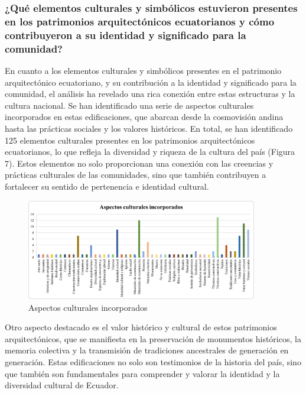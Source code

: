 \documentclass[journal,article,submit,pdftex,moreauthors]{Definitions/mdpi}
\begin{document}
\subsubsection{\textbf{¿Qué elementos culturales y simbólicos estuvieron presentes en los patrimonios arquitectónicos ecuatorianos y cómo contribuyeron a su identidad y significado para la comunidad?}}\par %
En cuanto a los elementos culturales y simbólicos presentes en el patrimonio arquitectónico ecuatoriano, y su contribución a la identidad y significado para la comunidad, el análisis ha revelado una rica conexión entre estas estructuras y la cultura nacional. Se han identificado una serie de aspectos culturales incorporados en estas edificaciones, que abarcan desde la cosmovisión andina hasta las prácticas sociales y los valores históricos. 
En total, se han identificado 125 elementos culturales presentes en los patrimonios arquitectónicos ecuatorianos, lo que refleja la diversidad y riqueza de la cultura del país (Figura 7). Estos elementos no solo proporcionan una conexión con las creencias y prácticas culturales de las comunidades, sino que también contribuyen a fortalecer su sentido de pertenencia e identidad cultural. 
 \par %
  \begin{figure} [h!]
    \centering
    \includegraphics[width=0.9\textwidth]{Graficos/Aspectos culturales incorporados.png }
    \caption{Aspectos culturales incorporados}
    \label{fig:grafico}
\end{figure}
\par %
Otro aspecto destacado es el valor histórico y cultural de estos patrimonios arquitectónicos, que se manifiesta en la preservación de monumentos históricos, la memoria colectiva y la transmisión de tradiciones ancestrales de generación en generación. Estas edificaciones no solo son testimonios de la historia del país, sino que también son fundamentales para comprender y valorar la identidad y la diversidad cultural de Ecuador.
\end{document}
